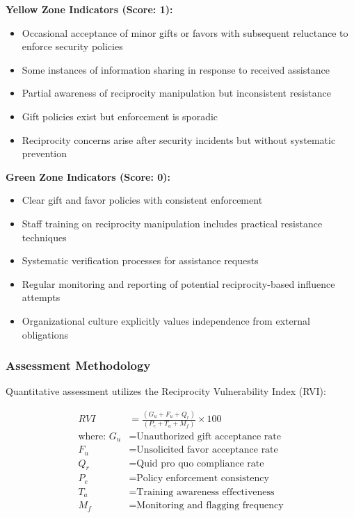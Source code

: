 \documentclass[11pt,a4paper]{article}
\begin{document}
\textbf{Yellow Zone Indicators (Score: 1):}
\begin{itemize}
\item Occasional acceptance of minor gifts or favors with subsequent reluctance to enforce security policies
\item Some instances of information sharing in response to received assistance
\item Partial awareness of reciprocity manipulation but inconsistent resistance
\item Gift policies exist but enforcement is sporadic
\item Reciprocity concerns arise after security incidents but without systematic prevention
\end{itemize}

\textbf{Green Zone Indicators (Score: 0):}
\begin{itemize}
\item Clear gift and favor policies with consistent enforcement
\item Staff training on reciprocity manipulation includes practical resistance techniques
\item Systematic verification processes for assistance requests
\item Regular monitoring and reporting of potential reciprocity-based influence attempts
\item Organizational culture explicitly values independence from external obligations
\end{itemize}

\subsubsection{Assessment Methodology}

Quantitative assessment utilizes the Reciprocity Vulnerability Index (RVI):

\begin{align}
RVI &= \frac{(G_u + F_u + Q_r)}{(P_e + T_a + M_f)} \times 100 \\
\text{where: } G_u &= \text{Unauthorized gift acceptance rate} \\
F_u &= \text{Unsolicited favor acceptance rate} \\
Q_r &= \text{Quid pro quo compliance rate} \\
P_e &= \text{Policy enforcement consistency} \\
T_a &= \text{Training awareness effectiveness} \\
M_f &= \text{Monitoring and flagging frequency}
\end{align}
\end{document}
